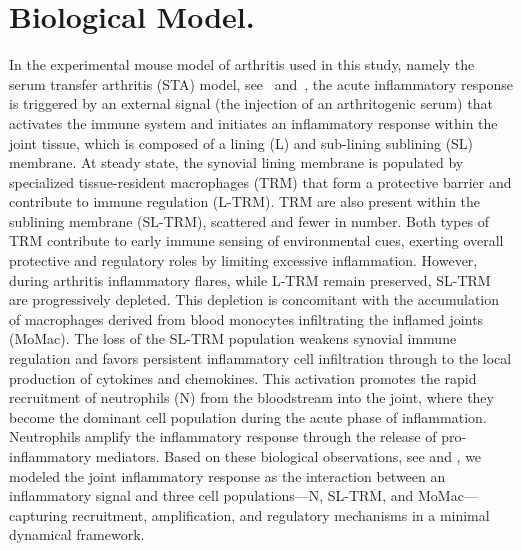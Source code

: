 \documentclass[a4paper, 12pt]{article}
\providecommand{\DIFaddtex}[1]{{\protect\color{blue} \sf #1}} %
\providecommand{\DIFdeltex}[1]{{\protect\color{red} \scriptsize #1}} %
\providecommand{\DIFaddbegin}{} %
\providecommand{\DIFaddend}{} %
\providecommand{\DIFdelbegin}{} %
\providecommand{\DIFdelend}{} %
\providecommand{\DIFadd}[1]{\texorpdfstring{\DIFaddtex{#1}}{#1}} %
\providecommand{\DIFdel}[1]{\texorpdfstring{\DIFdeltex{#1}}{}} %
\begin{document}
\section{Biological Model.}\label{sec:model}
In the experimental mouse model of arthritis used in this study, namely the serum transfer arthritis (STA) model, \DIFaddbegin \DIFadd{see~\cite{STA} and~\cite{weihaupt26},
 }\DIFaddend the acute inflammatory response is triggered by an external signal (the injection of an arthritogenic serum) 
 that activates the immune system and initiates an inflammatory response 
 within the joint tissue, which is composed of a lining (L) and \DIFdelbegin \DIFdel{sub-lining }\DIFdelend \DIFaddbegin \DIFadd{sublining }\DIFaddend (SL) membrane.
  At steady state, the synovial lining membrane is populated by specialized tissue-resident macrophages (TRM) 
  that form a protective barrier and contribute to immune regulation (L-TRM). TRM are also present within the sublining membrane (SL-TRM),
   scattered and fewer in number. 
  Both types of TRM contribute to early immune sensing of environmental cues, exerting overall protective and regulatory roles by limiting excessive inflammation.
   However, during arthritis inflammatory flares, while L-TRM remain preserved, SL-TRM are progressively depleted. 
   This depletion is concomitant with the accumulation of macrophages derived from blood monocytes infiltrating the inflamed joints (MoMac). 
   The loss of the SL-TRM population weakens synovial immune regulation and favors persistent inflammatory cell infiltration through 
   to the local production of cytokines and chemokines. This activation promotes the rapid recruitment of neutrophils (N) from the bloodstream into the joint, 
   where they become the dominant cell population during the acute phase of inflammation.
    Neutrophils amplify the inflammatory response through the release of pro-inflammatory mediators. 
     Based on these biological observations, \DIFdelbegin \DIFdel{see \cite{weihaupt26} and \cite{courties}, }\DIFdelend we modeled the joint inflammatory response as the interaction between an inflammatory signal and three cell populations—N, SL-TRM, and MoMac—capturing recruitment,
      amplification, and regulatory mechanisms in a minimal dynamical framework.
\end{document}
